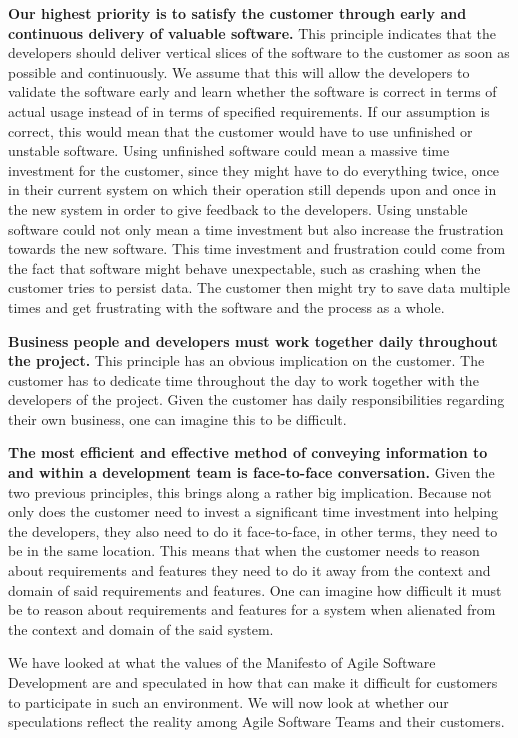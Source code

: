 \textbf{Our highest priority is to satisfy the customer through early and continuous delivery of valuable software.} 
This principle indicates that the developers should deliver vertical slices of the software to the customer as soon as possible and continuously. 
We assume that this will allow the developers to validate the software early and learn whether the software is correct in terms of actual usage instead of in terms of specified requirements.
If our assumption is correct, this would mean that the customer would have to use unfinished or unstable software.
Using unfinished software could mean a massive time investment for the customer, since they might have to do everything twice, once in their current system on which their operation still depends upon and once in the new system in order to give feedback to the developers. 
Using unstable software could not only mean a time investment but also increase the frustration towards the new software.
This time investment and frustration could come from the fact that software might behave unexpectable, such as crashing when the customer tries to persist data. The customer then might try to save data multiple times and get frustrating with the software and the process as a whole.

\textbf{Business people and developers must work together daily throughout the project.}
This principle has an obvious implication on the customer. 
The customer has to dedicate time throughout the day to work together with the developers of the project. 
Given the customer has daily responsibilities regarding their own business, one can imagine this to be difficult.

\textbf{The most efficient and effective method of conveying information to and within a development team is face-to-face conversation.} Given the two previous principles, this brings along a rather big implication. Because not only does the customer need to invest a significant time investment into helping the developers, they also need to do it face-to-face, in other terms, they need to be in the same location. This means that when the customer needs to reason about requirements and features they need to do it away from the context and domain of said requirements and features. One can imagine how difficult it must be to reason about requirements and features for a system when alienated from the context and domain of the said system.

We have looked at what the values of the Manifesto of Agile Software Development are and speculated in how that can make it difficult for customers to participate in such an environment. We will now look at whether our speculations reflect the reality among Agile Software Teams and their customers.

